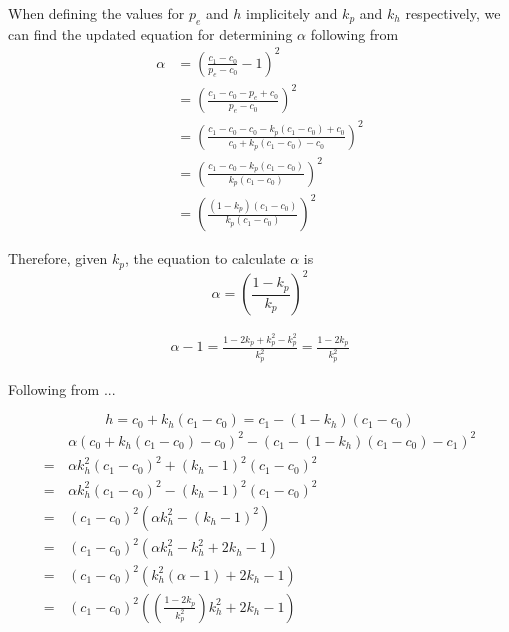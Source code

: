 When defining the values for $p_e$ and $h$ implicitely and $k_p$ and $k_h$ respectively, we can find the updated equation for determining $\alpha$ following from 
\begin{equation*}\begin{split}
		\alpha & = \left( \frac{c_1-c_0}{p_e-c_0} -1 \right)^2 \\
		& = \left( \frac{c_1-c_0-p_e+c_0}{p_e-c_0} \right)^2 \\
		& = \left( \frac{c_1-c_0 -c_0-k_p(c_1-c_0)+c_0}{c_0 + k_p(c_1-c_0)-c_0} \right)^2\\
		& = \left( \frac{c_1-c_0-k_p(c_1-c_0)}{k_p(c_1-c_0)} \right)^2\\
		& = \left( \frac{(1-k_p)(c_1-c_0)}{k_p(c_1-c_0)} \right)^2
\end{split}\end{equation*}

Therefore, given $k_p$, the equation to calculate $\alpha$ is
\begin{equation}
	\alpha = \left( \frac{1-k_p}{k_p} \right)^2
	\label{eq:alphafromkp}
\end{equation}

\begin{equation}\begin{split}
	\alpha-1 = \frac{1-2k_p+k_p^2-k_p^2}{k_p^2} = \frac{1-2k_p}{k_p^2}
\end{split}\end{equation}

Following from ...

\begin{equation*}
	h = c_0+k_h(c_1-c_0) = c_1-(1-k_h)(c_1-c_0)
\end{equation*}
\begin{equation*}\begin{split}
	&\alpha (c_0+k_h(c_1-c_0)-c_0)^2-(c_1-(1-k_h)(c_1-c_0)-c_1)^2\\
	=\,& \alpha k_h^2 (c_1-c_0)^2 + (k_h-1)^2(c_1-c_0)^2 \\
	=\,& \alpha k_h^2(c_1-c_0)^2-(k_h-1)^2(c_1-c_0)^2 \\
	=\,& (c_1-c_0)^2(\alpha k_h^2-(k_h-1)^2)\\
	=\,& (c_1-c_0)^2 \left( \alpha k_h^2 - k_h^2 + 2k_h - 1 \right)\\
	=\,& (c_1-c_0)^2 \left( k_h^2(\alpha-1) + 2k_h -1 \right) \\
	=\,& (c_1-c_0)^2\left( \left( \frac{1-2k_p}{k_p^2} \right)k_h^2 +2k_h -1 \right)
\end{split}\end{equation*}

